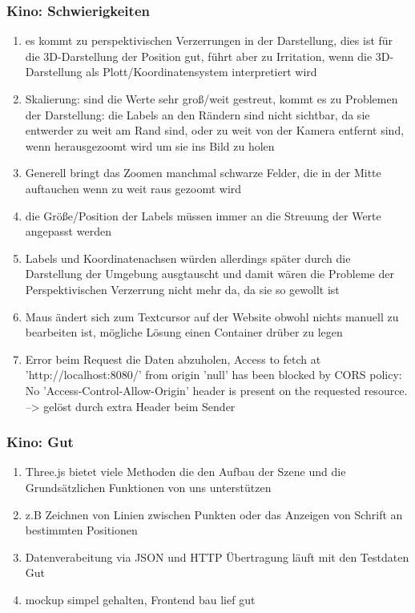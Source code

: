 \documentclass[a4paper, 11pt]{article}
\begin{document}
\subsubsection{Kino: Schwierigkeiten}
\begin{enumerate}
    \item es kommt zu perspektivischen Verzerrungen in der Darstellung, dies ist für die
  3D-Darstellung der Position gut, führt aber zu Irritation, wenn die 3D-Darstellung als
  Plott/Koordinatensystem interpretiert wird
    \item Skalierung: sind die Werte sehr groß/weit gestreut, kommt es zu Problemen der
  Darstellung: die Labels an den Rändern sind nicht sichtbar,
  da sie entwerder zu weit am Rand sind, oder zu weit von der Kamera entfernt sind,
  wenn herausgezoomt wird um sie ins Bild zu holen
    \item Generell bringt das Zoomen manchmal schwarze Felder, die in der Mitte auftauchen
  wenn zu weit raus gezoomt wird
    \item die Größe/Position der Labels müssen immer an die Streuung der Werte angepasst werden
    \item Labels und Koordinatenachsen würden allerdings später durch die Darstellung der Umgebung ausgtauscht und damit wären die Probleme der Perspektivischen Verzerrung nicht mehr da, da sie so gewollt ist
    \item Maus ändert sich zum Textcursor auf der Website obwohl nichts manuell zu bearbeiten ist, mögliche Lösung einen Container drüber zu legen
    \item Error beim Request die Daten abzuholen, Access to fetch at 'http://localhost:8080/' from origin 'null' has been blocked by CORS policy: No 'Access-Control-Allow-Origin' header is present on the requested resource. --> gelöst durch extra Header beim Sender

\end{enumerate}

\subsubsection{Kino: Gut}
\begin{enumerate}
    \item Three.js bietet viele Methoden die den Aufbau der Szene und die Grundsätzlichen Funktionen von uns unterstützen
    \item z.B Zeichnen von Linien zwischen Punkten oder das Anzeigen von Schrift an bestimmten Positionen
    \item Datenverabeitung via JSON und HTTP Übertragung läuft mit den Testdaten Gut
    \item mockup simpel gehalten, Frontend bau lief gut

\end{enumerate}
\end{document}
